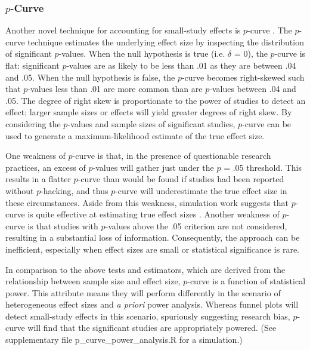 \documentclass[man, mask]{apa6}
\begin{document}
\subsubsection{$p$-Curve}
Another novel technique for accounting for small-study effects is $p$-curve \citep{Simonsohn:etal:2014,Simonsohn:etal:2014b}. The $p$-curve technique estimates the underlying effect size by inspecting the distribution of significant $p$-values. 
When the null hypothesis is true (i.e. $\delta$ = 0), the $p$-curve is flat: significant $p$-values are as likely to be less than .01 as they are between .04 and .05. When the null hypothesis is false, the $p$-curve becomes right-skewed such that $p$-values less than .01 are more common than are $p$-values between .04 and .05. The degree of right skew is proportionate to the power of studies to detect an effect; larger sample sizes or effects will yield greater degrees of right skew. By considering the $p$-values and sample sizes of significant studies, $p$-curve can be used to generate a maximum-likelihood estimate of the true effect size.

One weakness of $p$-curve is that, in the presence of questionable research practices, an excess of $p$-values will gather just under the $p$ = .05 threshold. This results in a flatter $p$-curve than would be found if studies had been reported without $p$-hacking, and thus $p$-curve will underestimate the true effect size in these circumstances. Aside from this weakness, simulation work suggests that $p$-curve is quite effective at estimating true effect sizes \citep{Simonsohn:etal:2014,Simonsohn:etal:2014b}.  Another weakness of $p$-curve is that studies with $p$-values above the .05 criterion are not considered, resulting in a substantial loss of information.  Consequently, the approach can be inefficient, especially when effect sizes are small or statistical significance is rare.

In comparison to the above tests and estimators, which are derived from the relationship between sample size and effect size, $p$-curve is a function of statistical power. This attribute means they will perform differently in the scenario of heterogeneous effect sizes and {\em a priori} power analysis. Whereas funnel plots will detect small-study effects in this scenario, spuriously suggesting research bias, $p$-curve will find that the significant studies are appropriately powered. (See supplementary file p_curve_power_analysis.R for a simulation.)
\end{document}
